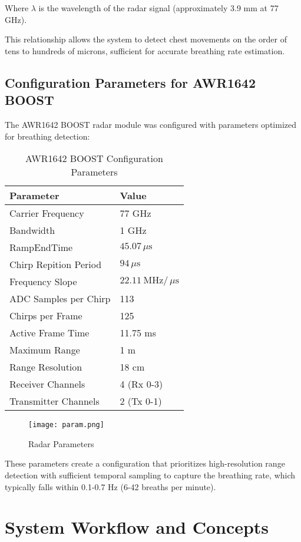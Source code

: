 \documentclass[12pt]{article}
\begin{document}
Where $\lambda$ is the wavelength of the radar signal (approximately 3.9 mm at 77 GHz).

This relationship allows the system to detect chest movements on the order of tens to hundreds of microns, sufficient for accurate breathing rate estimation.

\subsection{Configuration Parameters for AWR1642 BOOST}
The AWR1642 BOOST radar module was configured with parameters optimized for breathing detection:

\begin{table}[H]
\centering
\begin{tabular}{|l|l|}
\hline
\textbf{Parameter} & \textbf{Value} \\
\hline
Carrier Frequency & 77 GHz \\
Bandwidth & 1 GHz \\
RampEndTime & $45.07\,\mu\mathrm{s}$\\
Chirp Repition Period & $94\,\mu\mathrm{s}$ \\
Frequency Slope & $22.11~\mathrm{MHz}/\,\mu\mathrm{s}$ \\
ADC Samples per Chirp & 113 \\
Chirps per Frame & 125 \\
Active Frame Time & 11.75 ms \\
Maximum Range & 1 m \\
Range Resolution & 18 cm \\
Receiver Channels & 4 (Rx 0-3) \\
Transmitter Channels & 2 (Tx 0-1) \\
\hline
\end{tabular}
\caption{AWR1642 BOOST Configuration Parameters}
\end{table}

\begin{figure}[H]
\centering
\texttt{[image: param.png]} %
\caption{Radar Parameters}
\end{figure}

These parameters create a configuration that prioritizes high-resolution range detection with sufficient temporal sampling to capture the breathing rate, which typically falls within 0.1-0.7 Hz (6-42 breaths per minute).

\section{System Workflow and Concepts}
\end{document}
